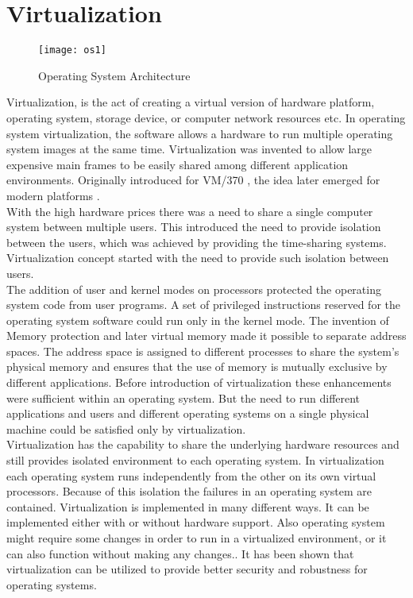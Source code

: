 \pagebreak

\section{Virtualization}

\begin{figure}[!ht]
\centering
\texttt{[image: os1]}
\caption{Operating System Architecture}
\label{fig:OS}
\end{figure}

Virtualization, is the act of creating a virtual version of hardware platform, operating system, storage device, or computer network resources etc. In operating system virtualization, the software allows a hardware to run multiple operating system images at the same time. Virtualization was invented to allow large expensive main frames to be easily shared among different application environments.\cite{Menascé05virtualization:concepts} Originally introduced for VM/370 \cite{Creasy:1981:OVT:1664853.1664863}, the idea later emerged for modern platforms \cite{Bugnion:1997:DRC:265924.265930, Rosenblum:2004:RVM:1016998.1017000}. 
\\
With the high hardware prices there was a need to share a single computer system between multiple users. This introduced the need to provide isolation between the users, which was achieved by providing the time-sharing systems. Virtualization concept started with the need to provide such isolation between users. 
\\
The addition of user and kernel modes on processors protected the operating system code from user programs. A set of privileged instructions reserved for the operating system software could run only in the kernel mode. The invention of Memory protection and later virtual memory made it possible to separate address spaces. The address space is assigned to different processes to share the system's physical memory and ensures that the use of memory is mutually exclusive by different applications. Before introduction of virtualization these enhancements were sufficient within an operating system. But the need to run different applications and users and different operating systems on a single physical machine could be satisfied only by virtualization.\cite{Crosby:2006:VR:1189276.1189289}
\\
Virtualization has the capability to share the underlying hardware resources and still provides isolated environment to each operating system. In virtualization each operating system runs independently from the other on its own virtual processors. Because of this isolation the failures in an operating system are contained. Virtualization is implemented in many different ways. It can be implemented either with or without hardware support. Also operating system might require some changes in order to run in a virtualized environment, or it can also function without making any changes.\cite{Drepper:2008:CV:1348583.1348591}. It has been shown that virtualization can be utilized to provide better security and robustness for operating systems\cite{Fraser04safehardware, LeVasseur04UnmodifiedDriverReuse, Riley:2008:GPK:1433006.1433008}.

